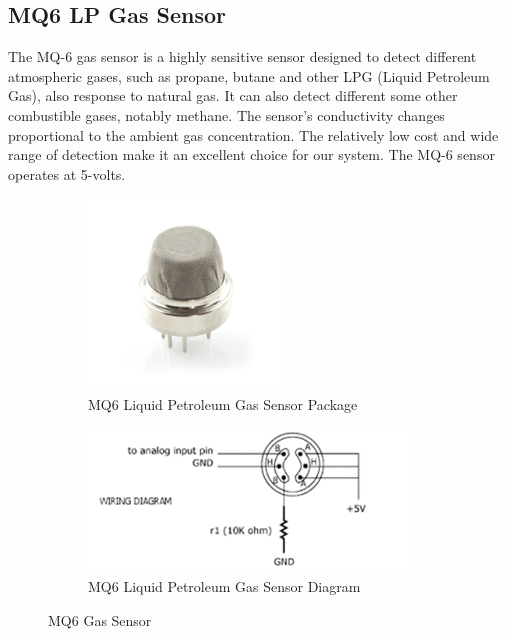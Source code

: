 \documentclass[a4paper,11pt]{report}
\begin{document}
	\subsection{MQ6 LP Gas Sensor}
	\par The MQ-6 gas sensor is a highly sensitive sensor designed to detect different atmospheric gases, such as propane, butane and other LPG (Liquid Petroleum Gas), also response to natural gas. It can also detect different some other combustible gases, notably methane. The sensor's conductivity changes proportional to the ambient gas concentration. The relatively low cost and wide range of detection make it an excellent choice for our system. The MQ-6 sensor operates at 5-volts.
	\begin{figure}[h!]
		\centering
		\begin{subfigure}[t]{0.45\textwidth}
			\centering
			\includegraphics[height = 2in]{mq6.png}
			\caption{MQ6 Liquid Petroleum Gas Sensor Package}
		\end{subfigure}
		\begin{subfigure}[t]{0.45\textwidth}
			\centering
			\includegraphics[height = 1.5in]{mq6diag.png}
			\caption{MQ6 Liquid Petroleum Gas Sensor Diagram}
		\end{subfigure}
	\caption{MQ6 Gas Sensor}
	\end{figure}
	\newpage
\end{document}
